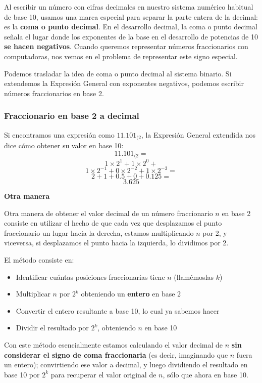 \documentclass[spanish,a4paper,]{article}
\providecommand{\tightlist}{%
  \setlength{\itemsep}{0pt}\setlength{\parskip}{0pt}}
\begin{document}
Al escribir un número con cifras decimales en nuestro sistema numérico
habitual de base 10, usamos una marca especial para separar la parte
entera de la decimal: es la \textbf{coma o punto decimal}. En el
desarrollo decimal, la coma o punto decimal señala el lugar donde los
exponentes de la base en el desarrollo de potencias de 10 \textbf{se
hacen negativos}. Cuando queremos representar números fraccionarios con
computadoras, nos vemos en el problema de representar este signo
especial.

Podemos trasladar la idea de coma o punto decimal al sistema binario. Si
extendemos la Expresión General con exponentes negativos, podemos
escribir números fraccionarios en base 2.

\hypertarget{fraccionario-en-base-2-a-decimal}{%
\subsubsection{Fraccionario en base 2 a
decimal}\label{fraccionario-en-base-2-a-decimal}}

Si encontramos una expresión como \(11.101_{(2}\), la Expresión General
extendida nos dice cómo obtener su valor en base 10: \[11.101_{(2}  = \]
\[1 \times 2^1 + 1 \times 2^0 +\]
\[1 \times 2^{-1} + 0 \times 2^{-2} + 1 \times 2^{-3} =\]
\[2 + 1 + 0.5 + 0 + 0.125 = \] \[3.625\]

\textbf{Otra manera}

Otra manera de obtener el valor decimal de un número fraccionario \(n\)
en base 2 consiste en utilizar el hecho de que cada vez que desplazamos
el punto fraccionario un lugar hacia la derecha, estamos multiplicando
\(n\) por 2, y viceversa, si desplazamos el punto hacia la izquierda, lo
dividimos por 2.

El método consiste en:

\begin{itemize}
\tightlist
\item
  Identificar cuántas posiciones fraccionarias tiene \(n\) (llamémoslas
  \(k\))
\item
  Multiplicar \(n\) por \(2^k\) obteniendo un \textbf{entero} en base 2
\item
  Convertir el entero resultante a base 10, lo cual ya sabemos hacer
\item
  Dividir el resultado por \(2^k\), obteniendo \(n\) en base 10
\end{itemize}

Con este método esencialmente estamos calculando el valor decimal de
\(n\) \textbf{sin considerar el signo de coma fraccionaria} (es decir,
imaginando que \(n\) fuera un entero); convirtiendo ese valor a decimal,
y luego dividiendo el resultado en base 10 por \(2^k\) para recuperar el
valor original de \(n\), sólo que ahora en base 10.
\end{document}
